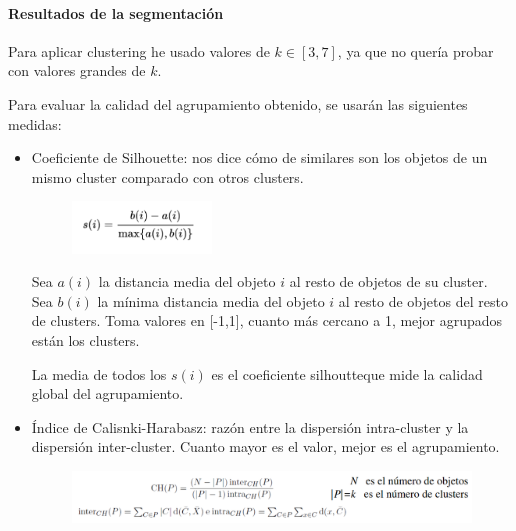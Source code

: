 \paragraph{Resultados de la segmentación}

Para aplicar clustering he usado valores de $k\in[3,7]$, ya que no quería probar con valores grandes de $k$.

Para evaluar la calidad del agrupamiento obtenido, se usarán las siguientes medidas:
\begin{itemize}
\item Coeficiente de Silhouette: nos dice cómo de similares son los objetos de un mismo cluster comparado con otros clusters.

\begin{figure}[H]
\centering
\includegraphics[width=0.35\textwidth]{imagenes/sil.png}
\end{figure}

Sea $a(i)$ la distancia media del objeto $i$ al resto de objetos de su cluster. Sea $b(i)$ la mínima distancia media del objeto $i$ al resto de objetos del resto de clusters. Toma valores en [-1,1], cuanto más cercano a 1, mejor agrupados están los clusters.

La media de todos los $s(i)$ es el coeficiente silhoutteque mide la calidad global del agrupamiento.

\item Índice de Calisnki-Harabasz: razón entre la dispersión intra-cluster y la dispersión inter-cluster. Cuanto mayor es el valor, mejor es el agrupamiento.

\begin{figure}[H]
\centering
\includegraphics[width=\textwidth]{imagenes/calinski.png}
\end{figure}

\end{itemize}


